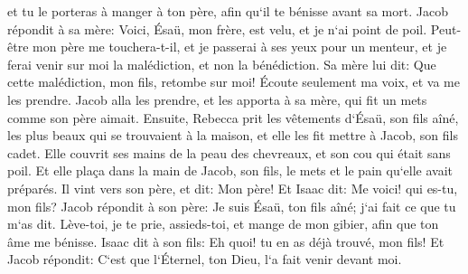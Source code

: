 \verse et tu le porteras à manger à ton père, afin qu`il te bénisse avant sa mort. 
\verse Jacob répondit à sa mère: Voici, Ésaü, mon frère, est velu, et je n`ai point de poil. 
\verse Peut-être mon père me touchera-t-il, et je passerai à ses yeux pour un menteur, et je ferai venir sur moi la malédiction, et non la bénédiction. 
\verse Sa mère lui dit: Que cette malédiction, mon fils, retombe sur moi! Écoute seulement ma voix, et va me les prendre. 
\verse Jacob alla les prendre, et les apporta à sa mère, qui fit un mets comme son père aimait. 
\verse Ensuite, Rebecca prit les vêtements d`Ésaü, son fils aîné, les plus beaux qui se trouvaient à la maison, et elle les fit mettre à Jacob, son fils cadet. 
\verse Elle couvrit ses mains de la peau des chevreaux, et son cou qui était sans poil. 
\verse Et elle plaça dans la main de Jacob, son fils, le mets et le pain qu`elle avait préparés. 
\verse Il vint vers son père, et dit: Mon père! Et Isaac dit: Me voici! qui es-tu, mon fils? 
\verse Jacob répondit à son père: Je suis Ésaü, ton fils aîné; j`ai fait ce que tu m`as dit. Lève-toi, je te prie, assieds-toi, et mange de mon gibier, afin que ton âme me bénisse. 
\verse Isaac dit à son fils: Eh quoi! tu en as déjà trouvé, mon fils! Et Jacob répondit: C`est que l`Éternel, ton Dieu, l`a fait venir devant moi. 
